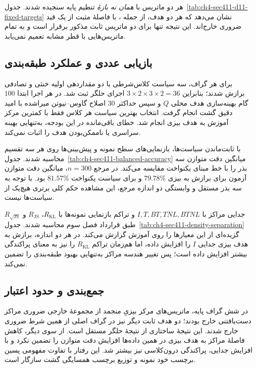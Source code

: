 هر دو ماتریس با \emph{همان نه بازهٔ} تنظیم پایه سنجیده شدند. جدول~\ref{tab:ch4-sec411-d11-fixed-targets} نشان می‌دهد که هر دو هدف، از جمله ، با فاصلهٔ مثبت از یک قید ضروری خارج‌اند. این نتیجه تنها برای دو ماتریس ثابت مذکور برقرار است و به تمام ماتریس‌هایی با قطر مشابه تعمیم نمی‌یابد.


\subsection{بازیابی عددی و عملکرد طبقه‌بندی}
\label{subsec:ch4-bayes-method-comparison}
برای هر گراف، سه سیاست کلاس‌شرطی با دو مقداردهی اولیه خنثی و تصادفی برازش شدند؛ بنابراین $3\times2\times3\times2=36$ اجرای حلگر ثبت شد. در هر اجرا ابتدا $100$ گام بهینه‌سازی هدف محلی $Q$ و سپس حداکثر $30$ اصلاح گاوس--نیوتن میراشده با امید دقیق گشت انجام گرفت. انتخاب بهترین سیاست هر کلاس فقط با کمترین  مرکز آموزش به هدف بیزی انجام شد. خطای باقی‌مانده در این بودجه، به‌تنهایی بهینه سراسری یا ناممکن‌بودن هدف را اثبات نمی‌کند.

با ثابت‌ماندن سیاست‌ها، بازنمایی‌های سطح نمونه و پیش‌بینی‌ها روی هر سه تقسیم محاسبه شدند. جدول~\ref{tab:ch4-sec411-balanced-accuracy} میانگین دقت متوازن سه بذر را با خط مبنای یکنواخت مقایسه می‌کند. در مرجع $n=300$، میانگین دقت متوازن آزمون برای برازش به بیزی $79.78\%$ و برای سیاست یکنواخت $81.57\%$ بود. با توجه به سه بذر مستقل و وابستگی دو اندازه مرجع، این مشاهده حکم کلی برتری هیچ‌یک از سیاست‌ها نیست.


جدایی مراکز با $I,T,BT,TNL,BTNL$ و تراکم بازنمایی نمونه‌ها با $R_{\mathrm{KL}}$، $R_{\mathrm{JS}}$ و $R_{\sqrt{\mathrm{JS}}}$ طبق قرارداد فصل سوم محاسبه شدند. جدول~\ref{tab:ch4-sec411-density-separation} گزیده‌ای از این معیارها را روی آموزش گزارش می‌کند. در هر دو اندازه، برازش به هدف بیزی جدایی $I$ را افزایش داده، اما هم‌زمان تراکم $R_{\mathrm{KL}}$ را نیز به معنای پراکندگی بیشتر افزایش داده است؛ پس تغییر هندسه مراکز به‌تنهایی بهبود طبقه‌بندی را تضمین نمی‌کند.


\subsection{جمع‌بندی و حدود اعتبار}
\label{subsec:ch4-sec411-conclusion}
در شش گراف پایه، ماتریس‌های مرکز بیزیِ منجمد از مجموعهٔ خارجی ضروری مراکز دست‌یافتنی خارج بودند؛ دو هدف ثابت دیگر نیز در گراف اصلی از همین شرط ضروری خارج شدند. این نتیجهٔ ساختاری از نتیجهٔ حلگر مستقل است. از سوی دیگر، کاهش فاصلهٔ مراکز به هدف بیزی در همین داده‌ها افزایش دقت متوازن را تضمین نکرد و با افزایش جدایی، پراکندگی درون‌کلاسی نیز بیشتر شد. این رفتار با تفاوت مفهومی پسین برچسب خود نمونه و توزیع برچسب همسایگی گشت سازگار است.

